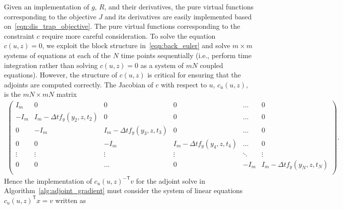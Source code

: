 \documentclass{article}
\newcommand{\trp}{^{\mathsf{T}}}
\newcommand{\invtrp}{^{-\mathsf{T}}}
\begin{document}
Given an implementation of $g$, $R$, and their derivatives, the pure virtual functions corresponding to the objective $J$ and its derivatives are easily implemented based on~\eqref{eqn:dis_trap_objective}. The pure virtual functions corresponding to the constraint $c$ require more careful consideration.
To solve the equation $c(u,z)=0$, we exploit the block structure in~\eqref{eqn:back_euler} and solve $m \times m$ systems of equations at each of the $N$ time points sequentially (i.e., perform time integration rather than solving $c(u,z)=0$ as a system of $mN$ coupled equations). However, the structure of $c(u,z)$ is critical for ensuring that the adjoints are computed correctly. The Jacobian of $c$ with respect to $u$, $c_u(u,z) $, is the $mN \times mN$ matrix
\begin{align*}
    \left( \begin{array}{cccccc}
    I_m & 0 & 0 & 0 & \dots & 0 \\
    -I_m & I_m - \Delta t f_y(y_2,z,t_2) & 0 & 0 & \dots & 0 \\
    0 & -I_m & I_m - \Delta t f_y(y_3,z,t_3) & 0 & \dots & 0 \\
    0 & 0 & -I_m & I_m - \Delta t f_y(y_4,z,t_4) & \dots & 0 \\
    \vdots & \vdots & \vdots & \vdots & \ddots & \vdots \\
    0 & 0  & \dots & 0 & -I_m & I_m - \Delta t f_y(y_N,z,t_N) \\
    \end{array} \right).
\end{align*}
Hence the implementation of $c_u(u,z)\invtrp v$ for the adjoint solve in Algorithm~\ref{alg:adjoint_gradient} must consider the system of linear equations $c_u(u,z)\trp x = v$ written as
\end{document}
